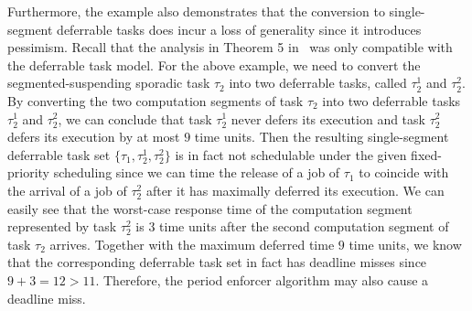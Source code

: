Furthermore, the example also demonstrates that the conversion to single-segment deferrable tasks does incur a loss of generality since it introduces pessimism. Recall that the analysis in Theorem 5 in~\cite{Raj:suspension1991} was only compatible with the deferrable task model. For the above example, we need to convert the segmented-suspending sporadic task $\tau_2$ into two deferrable tasks, called $\tau_2^1$ and $\tau_2^2$.
By converting the two computation segments of task $\tau_2$ into two deferrable tasks $\tau_2^1$ and $\tau_2^2$, we can conclude that  task $\tau_2^1$ never defers its execution and task $\tau_2^2$ defers its execution by at most \emph{$9$} time units.  Then the resulting single-segment deferrable task set $\{\tau_1, \tau_2^1, \tau_2^2\}$ is in fact not schedulable under the given fixed-priority scheduling since we can time the release of a job of $\tau_1$ to coincide with the arrival of a job of $\tau_2^2$ after it has maximally deferred its execution. We can easily see that the worst-case response time of the computation segment represented by task $\tau_2^2$ is $3$ time units after the second computation segment of task $\tau_2$ arrives. Together with the maximum deferred time $9$ time units, we know that the corresponding deferrable task set in fact has deadline misses since $9+3=12 > 11$. Therefore, the period enforcer algorithm may also cause a deadline miss.






